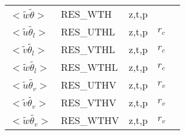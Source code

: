 \begin{center}
\begin{makeimage}
\begin{tabular}{||p{6cm}|>{\centering}p{2.5cm}|>{\centering}p{1.5cm}|>{\centering}p{0.5cm}|p{5cm }||}
\cline{1-4}
$<\tilde{w}\tilde{\theta}>$ & RES\_WTH &z,t,p &   &\\
\cline{1-4}
$<\tilde{u}\tilde{\theta_l}>$ & RES\_UTHL &z,t,p &  $r_c$  &\\
\cline{1-4}
$<\tilde{v}\tilde{\theta_l}>$ & RES\_VTHL &z,t,p &   $r_c$ &\\
\cline{1-4}
$<\tilde{w}\tilde{\theta_l}>$ & RES\_WTHL &z,t,p &   $r_c$ &\\
\cline{1-4}
$<\tilde{u}\tilde{\theta_v}>$ & RES\_UTHV &z,t,p &  $r_v$  &\\
\cline{1-4}
$<\tilde{v}\tilde{\theta_v}>$ & RES\_VTHV &z,t,p &   $r_v$ &\\
\cline{1-4}
$<\tilde{w}\tilde{\theta_v}>$ & RES\_WTHV &z,t,p &   $r_v$ &\\
\hline
\hline
\end{tabular}
\end{makeimage}
\end{center}

